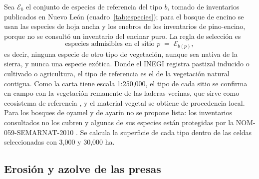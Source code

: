 Sea $\mathcal E_b$ el conjunto de especies de referencia del tipo $b$, tomado de inventarios publicados en Nuevo León (cuadro~\ref{tab:especies}); para el bosque de encino se usan las especies de hoja ancha y los enebros de los inventarios de pino-encino, porque no se consultó un inventario del encinar puro. La regla de selección es
\begin{equation}
\text{especies admisibles en el sitio } p \;=\; \mathcal E_{b(p)},
\end{equation}
es decir, ninguna especie de otro tipo de vegetación, aunque sea nativa de la sierra, y nunca una especie exótica. Donde el INEGI registra pastizal inducido o cultivado o agricultura, el tipo de referencia es el de la vegetación natural contigua. Como la carta tiene escala 1:250,000, el tipo de cada sitio se confirma en campo con la vegetación remanente de las laderas vecinas, que sirve como ecosistema de referencia , y el material vegetal se obtiene de procedencia local. Para los bosques de oyamel y de ayarín no se propone lista: los inventarios consultados no los cubren y algunas de sus especies están protegidas por la NOM-059-SEMARNAT-2010 . Se calcula la superficie de cada tipo dentro de las celdas seleccionadas con 3,000 y 30,000 ha.

\subsection{Erosión y azolve de las presas}\label{sec:rusle}

